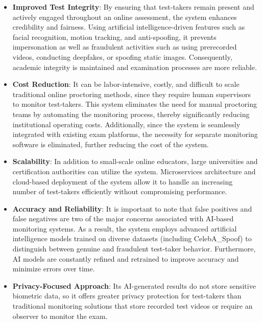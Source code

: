 \documentclass[12pt,a4paper]{article}
\begin{document}
\begin{itemize}
    \item \textbf{Improved Test Integrity}:  
    By ensuring that test-takers remain present and actively engaged throughout an online assessment, the system enhances credibility and fairness. Using artificial intelligence-driven features such as facial recognition, motion tracking, and anti-spoofing, it prevents impersonation as well as fraudulent activities such as using prerecorded videos, conducting deepfakes, or spoofing static images. Consequently, academic integrity is maintained and examination processes are more reliable.

    \item \textbf{Cost Reduction}:  
    It can be labor-intensive, costly, and difficult to scale traditional online proctoring methods, since they require human supervisors to monitor test-takers. This system eliminates the need for manual proctoring teams by automating the monitoring process, thereby significantly reducing institutional operating costs. Additionally, since the system is seamlessly integrated with existing exam platforms, the necessity for separate monitoring software is eliminated, further reducing the cost of the system.

    \item \textbf{Scalability}:  
    In addition to small-scale online educators, large universities and certification authorities can utilize the system. Microservices architecture and cloud-based deployment of the system allow it to handle an increasing number of test-takers efficiently without compromising performance.

    \item \textbf{Accuracy and Reliability}:  
    It is important to note that false positives and false negatives are two of the major concerns associated with AI-based monitoring systems. As a result, the system employs advanced artificial intelligence models trained on diverse datasets (including CelebA\_Spoof) to distinguish between genuine and fraudulent test-taker behavior. Furthermore, AI models are constantly refined and retrained to improve accuracy and minimize errors over time.

    \item \textbf{Privacy-Focused Approach}:  
    Its AI-generated results do not store sensitive biometric data, so it offers greater privacy protection for test-takers than traditional monitoring solutions that store recorded test videos or require an observer to monitor the exam.
\end{itemize}
\end{document}
